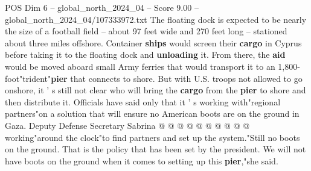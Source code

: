 \begin{textsample}{POS Dim 6 – global\_north\_2024\_04 – Score 9.00 – global\_north\_2024\_04/107333972.txt}
The floating dock is expected to be nearly the size of a football field -- about 97 feet wide and 270 feet long -- stationed about three miles offshore.
Container \textbf{ships} would screen their \textbf{cargo} in Cyprus before taking it to the floating dock and \textbf{unloading} it.
From there, the \textbf{aid} would be moved aboard small Army ferries that would transport it to an 1,800-foot"trident"\textbf{pier} that connects to shore.
But with U.S. troops not allowed to go onshore, it ' s still not clear who will bring the \textbf{cargo} from the \textbf{pier} to shore and then distribute it.
Officials have said only that it ' s working with"regional partners"on a solution that will ensure no American boots are on the ground in Gaza.
Deputy Defense Secretary Sabrina @ @ @ @ @ @ @ @ @ @ working"around the clock"to find partners and set up the system."Still no boots on the ground.
That is the policy that has been set by the president.
We will not have boots on the ground when it comes to setting up this \textbf{pier},"she said.

\end{textsample}
